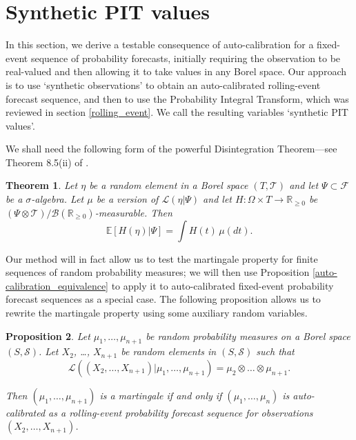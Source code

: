 \documentclass[aap]{imsart}
\theoremstyle{plain}
\newtheorem{theorem}{Theorem}[section]
\newtheorem{proposition}[theorem]{Proposition}
\theoremstyle{definition}
\begin{document}
\section{Synthetic PIT values}\label{syn_PITs}
In this section, we derive a testable consequence of auto-calibration for a fixed-event sequence of probability forecasts, initially requiring the observation to be real-valued and then allowing it to take values in any Borel space. Our approach is to use `synthetic observations' to obtain an auto-calibrated rolling-event forecast sequence, and then to use the Probability Integral Transform, which was reviewed in section \ref{rolling_event}. We call the resulting variables `synthetic PIT values'.

We shall need the following form of the powerful Disintegration Theorem---see Theorem 8.5(ii) of \cite{Kll21}.
\begin{theorem}\label{Disintegration}
  Let $\eta$ be a random element in a Borel space $(T,\mathcal{T})$ and let $\Psi \subset \mathcal{F}$ be a $\sigma$-algebra. Let $\mu$ be a version of $\mathcal{L}(\eta|\Psi)$ and let $H : \Omega \times T \to \mathbb{R}_{\geq 0}$ be $(\Psi \otimes \mathcal{T})/\mathcal{B}(\mathbb{R}_{\geq 0})$-measurable. Then
  \begin{equation*}
    \mathbb{E}[H(\eta)|\Psi] = \int H(t) \,\mu(dt).
  \end{equation*}
\end{theorem}

Our method will in fact allow us to test the martingale property for finite sequences of random probability measures; we will then use Proposition \ref{auto-calibration_equivalence} to apply it to auto-calibrated fixed-event probability forecast sequences as a special case. The following proposition allows us to rewrite the martingale property using some auxiliary random variables.
\begin{proposition}\label{synthetic_observations}
Let $\mu_1, \ldots, \mu_{n+1}$ be random probability measures on a Borel space $(S,\mathcal{S})$. Let $X_2$, \ldots, $X_{n+1}$ be random elements in $(S,\mathcal{S})$ such that
\begin{equation*}
  \mathcal{L}((X_2, \ldots, X_{n+1})|\mu_1, \ldots, \mu_{n+1}) = \mu_2 \otimes \ldots \otimes \mu_{n+1}.
\end{equation*}

  Then $(\mu_1, \ldots, \mu_{n+1})$ is a martingale if and only if $(\mu_1, \ldots, \mu_n)$ is auto-calibrated as a rolling-event probability forecast sequence for observations $(X_2, \ldots, X_{n+1})$.
\end{proposition}
\end{document}
